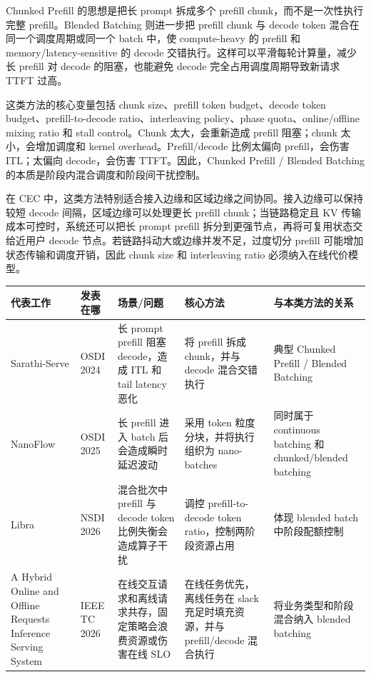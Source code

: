 \documentclass[a4paper,10pt]{ctexart}
\begin{document}
Chunked Prefill 的思想是把长 prompt 拆成多个 prefill chunk，而不是一次性执行完整 prefill。Blended Batching 则进一步把 prefill chunk 与 decode token 混合在同一个调度周期或同一个 batch 中，使 compute-heavy 的 prefill 和 memory/latency-sensitive 的 decode 交错执行。这样可以平滑每轮计算量，减少长 prefill 对 decode 的阻塞，也能避免 decode 完全占用调度周期导致新请求 TTFT 过高。


这类方法的核心变量包括 chunk size、prefill token budget、decode token budget、prefill-to-decode ratio、interleaving policy、phase quota、online/offline mixing ratio 和 stall control。Chunk 太大，会重新造成 prefill 阻塞；chunk 太小，会增加调度和 kernel overhead。Prefill/decode 比例太偏向 prefill，会伤害 ITL；太偏向 decode，会伤害 TTFT。因此，Chunked Prefill / Blended Batching 的本质是阶段内混合调度和阶段间干扰控制。


在 CEC 中，这类方法特别适合接入边缘和区域边缘之间协同。接入边缘可以保持较短 decode 间隔，区域边缘可以处理更长 prefill chunk；当链路稳定且 KV 传输成本可控时，系统还可以把长 prompt prefill 拆分到更强节点，再将可复用状态交给近用户 decode 节点。若链路抖动大或边缘并发不足，过度切分 prefill 可能增加状态传输和调度开销，因此 chunk size 和 interleaving ratio 必须纳入在线代价模型。


\begin{table}[H]
\centering
\scriptsize
\setlength{\tabcolsep}{3pt}
\renewcommand{\arraystretch}{1.15}
\begin{tabularx}{\textwidth}{|X|X|X|X|X|}
\hline
\textbf{代表工作} & \textbf{发表在哪} & \textbf{场景/问题} & \textbf{核心方法} & \textbf{与本类方法的关系} \\ \hline
Sarathi-Serve & OSDI 2024 & 长 prompt prefill 阻塞 decode，造成 ITL 和 tail latency 恶化 & 将 prefill 拆成 chunk，并与 decode 混合交错执行 & 典型 Chunked Prefill / Blended Batching \\ \hline
NanoFlow & OSDI 2025 & 长 prefill 进入 batch 后会造成瞬时延迟波动 & 采用 token 粒度分块，并将执行组织为 nano-batches & 同时属于 continuous batching 和 chunked/blended batching \\ \hline
Libra & NSDI 2026 & 混合批次中 prefill 与 decode token 比例失衡会造成算子干扰 & 调控 prefill-to-decode token ratio，控制两阶段资源占用 & 体现 blended batch 中阶段配额控制 \\ \hline
A Hybrid Online and Offline Requests Inference Serving System & IEEE TC 2026 & 在线交互请求和离线请求共存，固定策略会浪费资源或伤害在线 SLO & 在线任务优先，离线任务在 slack 充足时填充资源，并与 prefill/decode 混合执行 & 将业务类型和阶段混合纳入 blended batching \\ \hline
\end{tabularx}
\end{table}
\end{document}
